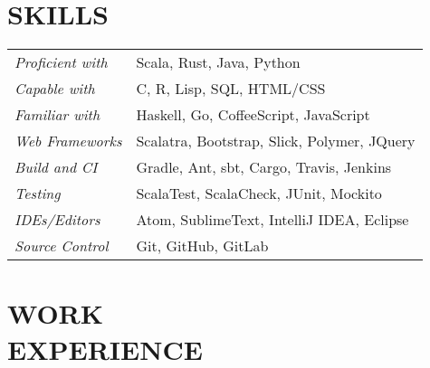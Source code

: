 \documentclass[margin]{res}
\begin{document}
\begin{resume}
\section{SKILLS}
   \begin{tabular}{l p{3in}}
                \textit{Proficient with} & Scala, Rust, Java, Python \\
                \textit{Capable with} & C, R, Lisp, SQL, HTML/CSS \\
                \textit{Familiar with} & Haskell, Go, CoffeeScript, JavaScript \\
                \textit{Web Frameworks}  & Scalatra, Bootstrap, Slick, Polymer, JQuery \\
                \textit{Build and CI}  & Gradle, Ant, sbt, Cargo, Travis, Jenkins \\
                \textit{Testing}  & ScalaTest, ScalaCheck, JUnit, Mockito\\
                \textit{IDEs/Editors}  & Atom, SublimeText, IntelliJ IDEA, Eclipse \\
                \textit{Source Control} &Git, GitHub, GitLab
 \end{tabular}


\section{WORK \\ EXPERIENCE}



\end{resume}
\end{document}
